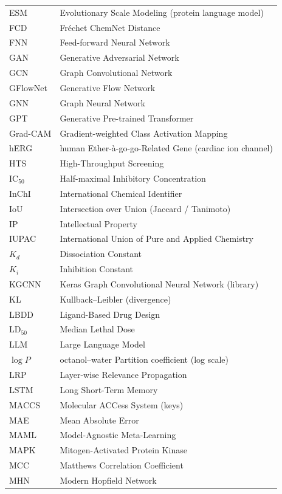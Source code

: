 \documentclass[11pt, oneside]{book}
\begin{document}
\begin{longtable}{@{}p{}p{}@{}}
ESM & Evolutionary Scale Modeling (protein language model) \\
FCD & Fr\'echet ChemNet Distance \\
FNN & Feed-forward Neural Network \\
GAN & Generative Adversarial Network \\
GCN & Graph Convolutional Network \\
GFlowNet & Generative Flow Network \\
GNN & Graph Neural Network \\
GPT & Generative Pre-trained Transformer \\
Grad-CAM & Gradient-weighted Class Activation Mapping \\
hERG & human Ether-\`a-go-go-Related Gene (cardiac ion channel) \\
HTS & High-Throughput Screening \\
IC$_{50}$ & Half-maximal Inhibitory Concentration \\
InChI & International Chemical Identifier \\
IoU & Intersection over Union (Jaccard / Tanimoto) \\
IP & Intellectual Property \\
IUPAC & International Union of Pure and Applied Chemistry \\
$K_d$ & Dissociation Constant \\
$K_i$ & Inhibition Constant \\
KGCNN & Keras Graph Convolutional Neural Network (library) \\
KL & Kullback--Leibler (divergence) \\
LBDD & Ligand-Based Drug Design \\
LD$_{50}$ & Median Lethal Dose \\
LLM & Large Language Model \\
$\log P$ & octanol--water Partition coefficient (log scale) \\
LRP & Layer-wise Relevance Propagation \\
LSTM & Long Short-Term Memory \\
MACCS & Molecular ACCess System (keys) \\
MAE & Mean Absolute Error \\
MAML & Model-Agnostic Meta-Learning \\
MAPK & Mitogen-Activated Protein Kinase \\
MCC & Matthews Correlation Coefficient \\
MHN & Modern Hopfield Network \\

\end{longtable}
\end{document}
